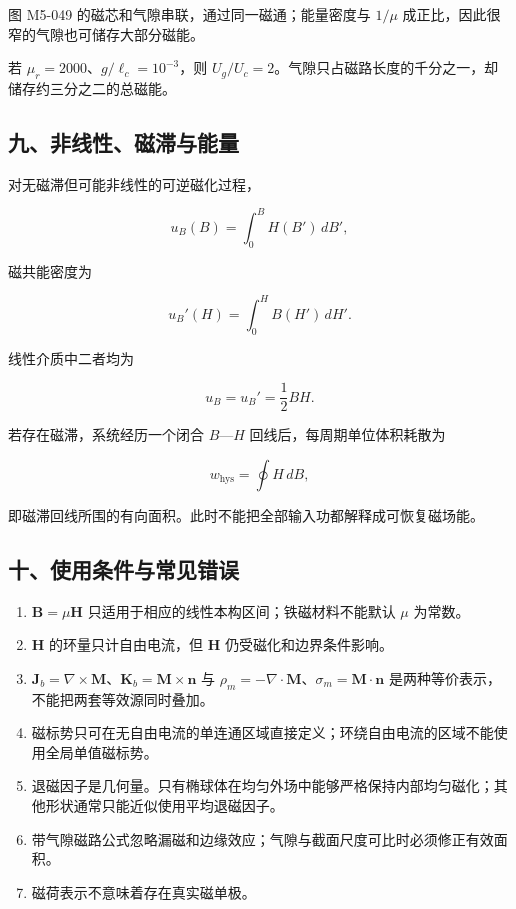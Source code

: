 图 M5-049 的磁芯和气隙串联，通过同一磁通；能量密度与 \(1/\mu\)
成正比，因此很窄的气隙也可储存大部分磁能。

若 \(\mu_r=2000\)、\(g/\ell_c=10^{-3}\)，则
\(U_g/U_c=2\)。气隙只占磁路长度的千分之一，却储存约三分之二的总磁能。

\subsection{九、非线性、磁滞与能量}\label{m5:ux4e5dux975eux7ebfux6027ux78c1ux6edeux4e0eux80fdux91cf}

对无磁滞但可能非线性的可逆磁化过程，

\[
\boxed{
u_B(B)=\int_0^B H(B')\,dB'
},
\]

磁共能密度为

\[
\boxed{
u_B'(H)=\int_0^H B(H')\,dH'
}.
\]

线性介质中二者均为

\[
u_B=u_B'=\frac12BH.
\]

若存在磁滞，系统经历一个闭合 \(B\)---\(H\) 回线后，每周期单位体积耗散为

\[
\boxed{
w_{\mathrm{hys}}=\oint H\,dB
},
\]

即磁滞回线所围的有向面积。此时不能把全部输入功都解释成可恢复磁场能。

\subsection{十、使用条件与常见错误}\label{m5:ux5341ux4f7fux7528ux6761ux4ef6ux4e0eux5e38ux89c1ux9519ux8bef-1}

\begin{enumerate}
\def\labelenumi{\arabic{enumi}.}
\tightlist
\item
  \(\mathbf B=\mu\mathbf H\)
  只适用于相应的线性本构区间；铁磁材料不能默认 \(\mu\) 为常数。
\item
  \(\mathbf H\) 的环量只计自由电流，但 \(\mathbf H\)
  仍受磁化和边界条件影响。
\item
  \(\mathbf J_b=\nabla\times\mathbf M\)、\(\mathbf K_b=\mathbf M\times\mathbf n\)
  与
  \(\rho_m=-\nabla\cdot\mathbf M\)、\(\sigma_m=\mathbf M\cdot\mathbf n\)
  是两种等价表示，不能把两套等效源同时叠加。
\item
  磁标势只可在无自由电流的单连通区域直接定义；环绕自由电流的区域不能使用全局单值磁标势。
\item
  退磁因子是几何量。只有椭球体在均匀外场中能够严格保持内部均匀磁化；其他形状通常只能近似使用平均退磁因子。
\item
  带气隙磁路公式忽略漏磁和边缘效应；气隙与截面尺度可比时必须修正有效面积。
\item
  磁荷表示不意味着存在真实磁单极。
\end{enumerate}

